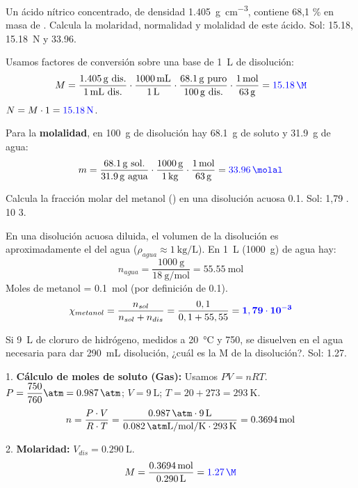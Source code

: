 \begin{exercise}
    Un ácido nítrico concentrado, de densidad \qty{1.405}{\g\per\cubic\centi\metre}, contiene 68,1 \% en masa de . Calcula la molaridad, normalidad y molalidad de este ácido.
    Sol: \qty{15.18}{\M},  \qty{15.18}{\N} y  \qty{33.96}{\molal}.
    \begin{solu}
        Usamos factores de conversión sobre una base de \qty{1}{\L} de disolución:
        \[ M = \dfrac{\qty{1.405}{\g} \text{ dis.}}{\qty{1}{\mL} \text{ dis.}} \cdot \dfrac{\qty{1000}{\mL}}{\qty{1}{\L}} \cdot \dfrac{\qty{68.1}{\g} \text{ puro}}{\qty{100}{\g} \text{ dis.}} \cdot \dfrac{\qty{1}{\mol}}{\qty{63}{\g}} = \mathbf{\textcolor{blue}{\qty{15.18}{\M}}} \]
        $N = M \cdot 1 = \mathbf{\textcolor{blue}{\qty{15.18}{\N}}}$.

        Para la \textbf{molalidad}, en \qty{100}{\g} de disolución hay \qty{68.1}{\g} de soluto y \qty{31.9}{\g} de agua:
        \[ m = \dfrac{\qty{68.1}{\g} \text{ sol.}}{\qty{31.9}{\g} \text{ agua}} \cdot \dfrac{\qty{1000}{\g}}{\qty{1}{\kg}} \cdot \dfrac{\qty{1}{\mol}}{\qty{63}{\g}} = \mathbf{\textcolor{blue}{\qty{33.96}{\molal}}} \]
    \end{solu}

\end{exercise}

\begin{exercise}
    Calcula la fracción molar del metanol () en una disolución acuosa \qty{0.1}{\M}. Sol: 1,79 . 10 3.
    \begin{solu}
        En una disolución acuosa diluida, el volumen de la disolución es aproximadamente el del agua ($\rho_{agua} \approx \qty{1}{\kg\per\L}$). En \qty{1}{\L} (\qty{1000}{\g}) de agua hay:
        \[ n_{agua} = \dfrac{\qty{1000}{\g}}{\qty{18}{\g\per\mol}} = \qty{55.55}{\mol} \]
        Moles de metanol = \qty{0.1}{\mol} (por definición de \qty{0.1}{\M}).
        \[ \chi_{metanol} = \dfrac{n_{sol}}{n_{sol} + n_{dis}} = \dfrac{0,1}{0,1 + 55,55} = \mathbf{\textcolor{blue}{1,79 \cdot 10^{-3}}} \]
    \end{solu}
\end{exercise}

\begin{exercise}
    Si \qty{9}{\L} de cloruro de hidrógeno, medidos a \qty{20}{\celsius} y \qty{750}{\mmhg}, se disuelven en el agua necesaria para dar \qty{290}{\mL} disolución, ¿cuál es la M de la disolución?.
    Sol: \qty{1.27}{\M}.

    \begin{solu}
        1. \textbf{Cálculo de moles de soluto (Gas):} Usamos $PV = nRT$.
        $P = \dfrac{750}{760} \unit{\atm} = \qty{0.987}{\atm}$; $V = \qty{9}{\L}$; $T = 20 + 273 = \qty{293}{\K}$.
        \[ n = \dfrac{P \cdot V}{R \cdot T} = \dfrac{\qty{0.987}{\atm} \cdot \qty{9}{\L}}{\qty{0.082}{\atm\L\per\mol\per\K} \cdot \qty{293}{\K}} = \qty{0.3694}{\mol} \]

        2. \textbf{Molaridad:} $V_{dis} = \qty{0.290}{\L}$.
        \[ M = \dfrac{\qty{0.3694}{\mol}}{\qty{0.290}{\L}} = \mathbf{\textcolor{blue}{\qty{1.27}{\M}}} \]
    \end{solu}
\end{exercise}

